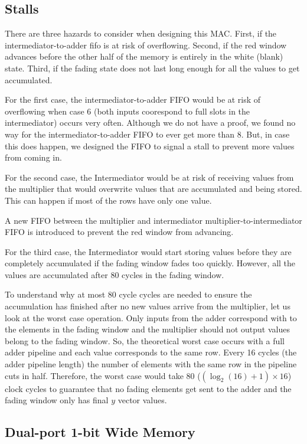 \subsection{Stalls}
There are three hazards to consider when designing this MAC. First, if the intermediator-to-adder fifo is at risk of overflowing. Second, if the red window advances before the other half of the memory is entirely in the white (blank) state. Third, if the fading state does not last long enough for all the values to get accumulated.

For the first case, the intermediator-to-adder FIFO would be at risk of overflowing when case 6 (both inputs coorespond to full slots in the intermediator) occurs very often. Although we do not have a proof, we found no way for the intermediator-to-adder FIFO to ever get more than 8. But, in case this does happen, we designed the FIFO to signal a stall to prevent more values from coming in.

For the second case, the Intermediator would be at risk of receiving values from the multiplier that would overwrite values that are accumulated and being stored. This can happen if most of the rows have only one value.

A new FIFO between the multiplier and intermediator multiplier-to-intermediator FIFO is introduced to prevent the red window from advancing.

For the third case, the Intermediator would start storing values before they are completely accumulated if the fading window fades too quickly. However, all the values are accumulated after 80 cycles in the fading window.

\par To understand why at most 80 cycle cycles are needed to ensure the accumulation has finished after no new values arrive from the multiplier, let us look at the worst case operation. Only inputs from the adder correspond with to the elements in the fading window and the multiplier should not output values belong to the fading window. So, the theoretical worst case occurs with a full adder pipeline and each value corresponds to the same row. Every 16 cycles (the adder pipeline length) the number of elements with the same row in the pipeline cuts in half. Therefore, the worst case would take 80 ($(\log_2(16) + 1) \times 16$) clock cycles to guarantee that no fading elements get sent to the adder and the fading window only has final $y$ vector values.

\subsection{Dual-port 1-bit Wide Memory}


